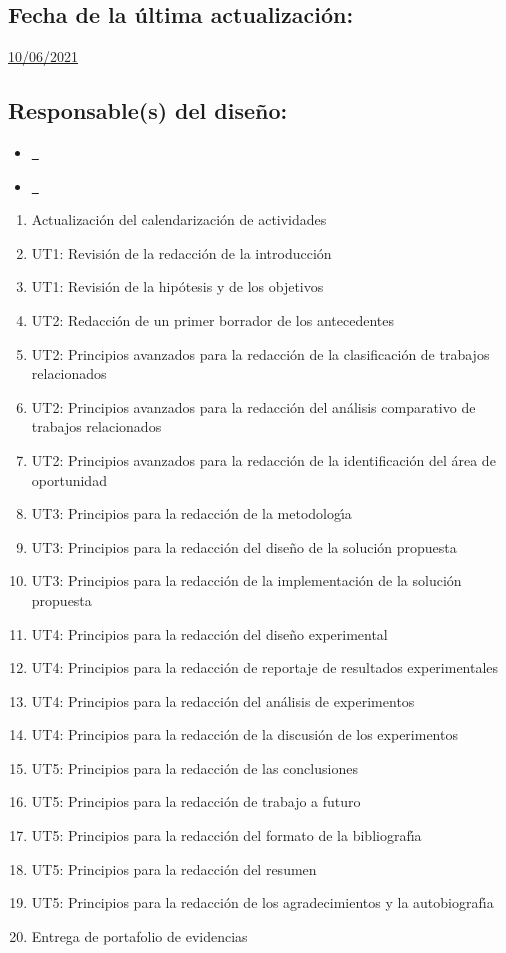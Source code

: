 \documentclass[10 pt]{article}
\begin{document}
\subsection{Fecha de la \'{u}ltima actualizaci\'{o}n:} \underline{10/06/2021}
\subsection{Responsable(s) del dise\~{n}o:}
\begin{itemize}[label={}]
\item \underline{\nroger~\roger}
\item \underline{\nelisa~\elisa}
\end{itemize}
\newpage



\begin{enumerate}[itemsep=-2pt]
\item Actualizaci\'{o}n del calendarizaci\'{o}n de actividades
\item UT1: Revisi\'{o}n de la redacci\'{o}n de la introducci\'{o}n
\item UT1: Revisi\'{o}n de la hip\'{o}tesis y de los objetivos
\item UT2: Redacci\'{o}n de un primer borrador de los antecedentes
\item UT2: Principios avanzados para la redacci\'{o}n de la clasificaci\'{o}n de trabajos relacionados
\item UT2: Principios avanzados para la redacci\'{o}n del an\'{a}lisis comparativo de trabajos relacionados
\item UT2: Principios avanzados para la redacci\'{o}n de la identificaci\'{o}n del \'{a}rea de oportunidad
\item UT3: Principios para la redacci\'{o}n de la metodolog\'{\i}a
\item UT3: Principios para la redacci\'{o}n del dise\~{n}o de la soluci\'{o}n propuesta
\item UT3: Principios para la redacci\'{o}n de la implementaci\'{o}n de la soluci\'{o}n propuesta
\item UT4: Principios para la redacci\'{o}n del dise\~{n}o experimental
\item UT4: Principios para la redacci\'{o}n de reportaje de resultados experimentales
\item UT4: Principios para la redacci\'{o}n del an\'{a}lisis de experimentos
\item UT4: Principios para la redacci\'{o}n de la discusi\'{o}n de los experimentos
\item UT5: Principios para la redacci\'{o}n de las conclusiones
\item UT5: Principios para la redacci\'{o}n de trabajo a futuro
\item UT5: Principios para la redacci\'{o}n del formato de la bibliograf\'{\i}a
\item UT5: Principios para la redacci\'{o}n del resumen
\item UT5: Principios para la redacci\'{o}n de los agradecimientos y la autobiograf\'{\i}a
\item Entrega de portafolio de evidencias
\end{enumerate}
\end{document}
